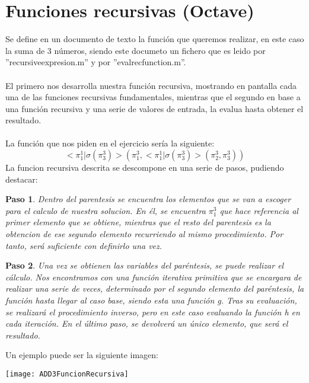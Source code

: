 \documentclass{article}
\newtheorem{example}{Paso}
\begin{document}
\section{Funciones recursivas (Octave)}
Se define en un documento de texto la función que queremos realizar, en este caso la suma de 3 números, siendo este documeto un fichero que es leido por ''recursiveexpresion.m'' y por ''evalrecfunction.m''.
\\ 
\\
El primero nos desarrolla nuestra función recursiva, mostrando en pantalla cada una de las funciones recursivas fundamentales, mientras que el segundo en base a una función recursiva y una serie de valores de entrada, la evalua hasta obtener el resultado.
\\
\\
La función que nos piden en el ejercicio sería la siguiente:
\begin{equation*}
<\pi^1_1|\sigma(\pi^3_3)>(\pi^3_1,<\pi^1_1|\sigma(\pi^3_3)>(\pi^3_2,\pi^3_3))
\end{equation*}
La funcion recursiva descrita se descompone en una serie de pasos, pudiendo destacar:

\begin{example}
Dentro del parentesis se encuentra los elementos que se van a escoger para el calculo de nuestra solucion. En él, se encuentra $\pi^3_1$ que hace referencia al primer elemento que se obtiene, mientras que el resto del parentesis es la obtencion de ese segundo elemento recurriendo al mismo procedimiento. Por tanto, será suficiente con definirlo una vez.
\end{example}

\begin{example}
Una vez se obtienen las variables del paréntesis, se puede realizar el cálculo. Nos encontramos con una función iterativa primitiva que se encargara de realizar una serie de veces, determinado por el segundo elemento del paréntesis, la función hasta llegar al caso base, siendo esta una función g. Tras su evaluación, se realizará el procedimiento inverso, pero en este caso evaluando la función h en cada iteración. En el último paso, se devolverá un único elemento, que será el resultado.
\end{example}
\begin{flushleft}Un ejemplo puede ser la siguiente imagen:\end{flushleft}



\texttt{[image: ADD3FuncionRecursiva]}
\end{document}
